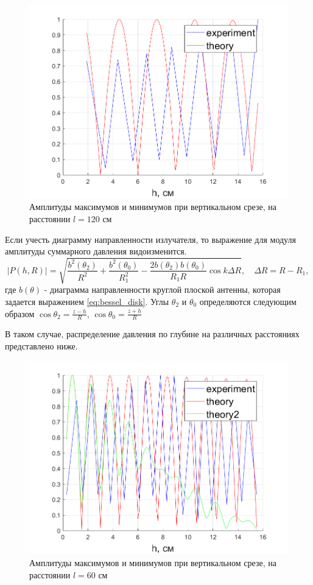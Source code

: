 \begin{figure}[H]
	\centering
	\includegraphics[width =0.6\linewidth]{pic/z3_3}
	\caption{Амплитуды максимумов и минимумов при вертикальном срезе, на расстоянии $l=120$ см}
	\label{fig:task33}
\end{figure}

Если учесть диаграмму направленности излучателя, то выражение для модуля амплитуды суммарного давления видоизменится.
\begin{equation}
|P(h,R)| = \sqrt{ \frac{b^2(\theta_2)}{R^2} + \frac{b^2(\theta_0)}{R_1^2} - \frac{2b(\theta_2)b(\theta_0)}{R_1 R} \cos k \Delta R },\quad \Delta R = R-R_1,
\label{eq:pressure2}
\end{equation}
где $b(\theta)$ - диаграмма направленности круглой плоской антенны, которая задается выражением \eqref{eq:bessel_disk}. Углы $\theta_2$ и $\theta_0$ определяются следующим образом $\displaystyle \cos\theta_2=\frac{z-h}{R}$, $\displaystyle \cos\theta_0=\frac{z+h}{R}$

В таком случае, распределение давления по глубине на различных расстояниях представлено ниже. 
\begin{figure}[H]
	\centering
	\includegraphics[width =0.6\linewidth]{pic/z3_1th}
	\caption{Амплитуды максимумов и минимумов при вертикальном срезе, на расстоянии $l=60$ см}
	\label{fig:task31th}
\end{figure}

